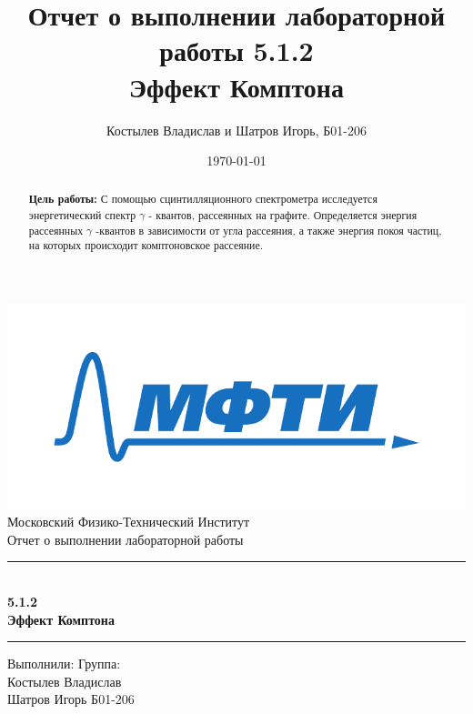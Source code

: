 \documentclass[a4paper, 12pt]{article}
\author{Костылев Владислав и Шатров Игорь, Б01-206}
\date{\today}
\title{Отчет о выполнении лабораторной работы 5.1.2 \\ \textbf{Эффект Комптона} }
\begin{document}

\begin{titlepage}
		\vspace*{\fill}
		
		\begin{center}
			\includegraphics[scale=0.8]{res/MIPT.pdf}
			\\[0.7cm]\Huge Московский Физико-Технический Институт
			\\[2cm]\LARGE Отчет о выполнении лабораторной работы 
			\\[0.5cm]\noindent\rule{\textwidth}{1pt}
			\\\Huge\textbf{5.1.2 \\ Эффект Комптона}
			\\[-0.5cm]\noindent\rule{\textwidth}{1pt}
		\end{center}
		
		\vspace*{\fill}
		
		\begin{flushleft}
			Выполнили: \hspace{\fill} Группа:
			\\Костылев Владислав \\ Шатров Игорь \hspace{\fill} Б01-206
		\end{flushleft}
	\end{titlepage}

	\setcounter{page}{2}

\begin{abstract}
    \textbf{Цель работы:}
    С помощью сцинтилляционного спектрометра исследуется энергетический спектр $\gamma$ - квантов, 
    рассеянных на графите. Определяется энергия рассеянных $\gamma$ -квантов в зависимости от угла рассеяния, 
    а также энергия покоя частиц, на которых происходит комптоновское рассеяние.
\end{abstract}
\end{document}
